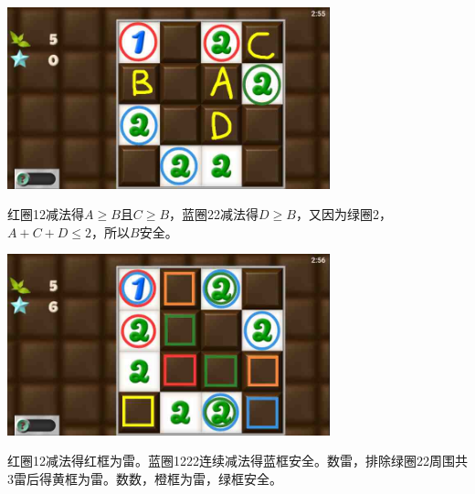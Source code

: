 \subsection{} %
\begin{center}
    \includegraphics[width=0.7\textwidth]{puzzlelow/152-1.jpg}
\end{center}
红圈12减法得$A\ge B$且$C\ge B$，蓝圈22减法得$D\ge B$，又因为绿圈2，$A+C+D\le 2$，所以$B$安全。
\begin{center}
    \includegraphics[width=0.7\textwidth]{puzzlelow/152-2.jpg}
\end{center}
红圈12减法得红框为雷。蓝圈1222连续减法得蓝框安全。数雷，排除绿圈22周围共3雷后得黄框为雷。数数，橙框为雷，绿框安全。

